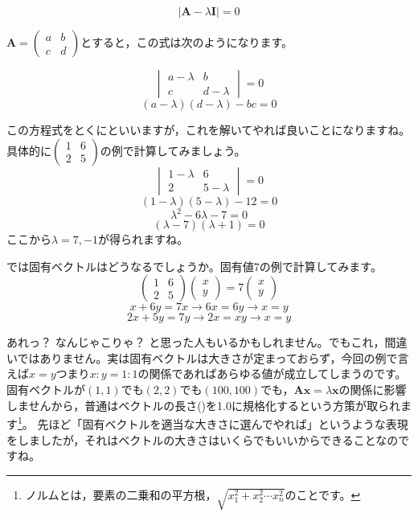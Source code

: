 \documentclass{ltjsbook}
\begin{document}
\[ | \bm{A} - \lambda \bm{I} | = 0 \]

$\bm{A} = \begin{pmatrix} a & b \\ c & d \end{pmatrix} $とすると，この式は次のようになります。

\[   \begin{vmatrix} a-\lambda & b \\ c & d - \lambda \end{vmatrix} = 0 \]
\[ (a-\lambda)(d-\lambda) - bc = 0 \]

この方程式をとくにといいますが，これを解いてやれば良いことになりますね。具体的に$\begin{pmatrix}1&6\\2&5\end{pmatrix}$の例で計算してみましょう。
\[ \begin{vmatrix}1-\lambda & 6 \\ 2 & 5-\lambda\end{vmatrix}=0\]
\[ (1-\lambda)(5-\lambda) - 12 = 0 \]
\[ \lambda^2 - 6\lambda -7 = 0 \]
\[ (\lambda-7)(\lambda+1)=0\]
ここから$\lambda=7,-1$が得られますね。

では固有ベクトルはどうなるでしょうか。固有値7の例で計算してみます。
\[ \begin{pmatrix} 1 & 6 \\ 2 & 5 \end{pmatrix}\begin{pmatrix} x\\y\end{pmatrix} = 7 \begin{pmatrix} x\\y\end{pmatrix} \]
\[ x + 6y = 7x \to 6x = 6y \to x=y \]
\[ 2x+5y = 7y \to 2x = xy \to x=y \]

あれっ？ なんじゃこりゃ？ と思った人もいるかもしれません。でもこれ，間違いではありません。実は固有ベクトルは大きさが定まっておらず，今回の例で言えば$x=y$つまり$x:y=1:1$の関係であればあらゆる値が成立してしまうのです。
固有ベクトルが$(1,1)$でも$(2,2)$でも$(100,100)$でも，$\bm{Ax}=\lambda \bm{x}$の関係に影響しませんから，普通はベクトルの長さ()を1.0に規格化するという方策が取られます\footnote{ノルムとは，要素の二乗和の平方根，$\sqrt{x_1^2 + x_2^2 \cdots x_n^2}$のことです。}。
先ほど「固有ベクトルを適当な大きさに選んでやれば」というような表現をしましたが，それはベクトルの大きさはいくらでもいいからできることなのですね。
\end{document}
